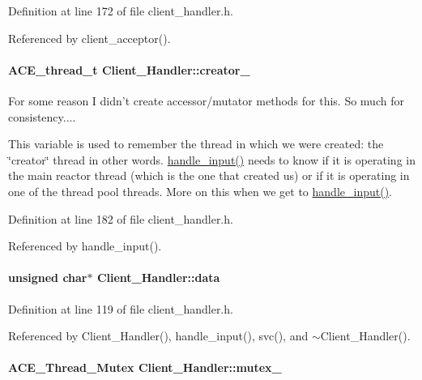 Definition at line 172 of file client\_\-handler.h.

Referenced by client\_\-acceptor().\hypertarget{classClient__Handler_Client__Handlern5}{
\paragraph[creator\_\-]{\setlength{\rightskip}{0pt plus 5cm}ACE\_\-thread\_\-t Client\_\-Handler::creator\_\-}\hfill}
\label{classClient__Handler_Client__Handlern5}


For some reason I didn't create accessor/mutator methods for this. So much for consistency....

This variable is used to remember the thread in which we were created: the \char`\"{}creator\char`\"{} thread in other words. \hyperlink{classClient__Handler_Client__Handlera5}{handle\_\-input()} needs to know if it is operating in the main reactor thread (which is the one that created us) or if it is operating in one of the thread pool threads. More on this when we get to \hyperlink{classClient__Handler_Client__Handlera5}{handle\_\-input()}. 

Definition at line 182 of file client\_\-handler.h.

Referenced by handle\_\-input().\hypertarget{classClient__Handler_Client__Handlern2}{
\paragraph[data]{\setlength{\rightskip}{0pt plus 5cm}unsigned char$\ast$ Client\_\-Handler::data}\hfill}
\label{classClient__Handler_Client__Handlern2}




Definition at line 119 of file client\_\-handler.h.

Referenced by Client\_\-Handler(), handle\_\-input(), svc(), and $\sim$Client\_\-Handler().\hypertarget{classClient__Handler_Client__Handlern0}{
\paragraph[mutex\_\-]{\setlength{\rightskip}{0pt plus 5cm}ACE\_\-Thread\_\-Mutex Client\_\-Handler::mutex\_\-}\hfill}
\label{classClient__Handler_Client__Handlern0}




